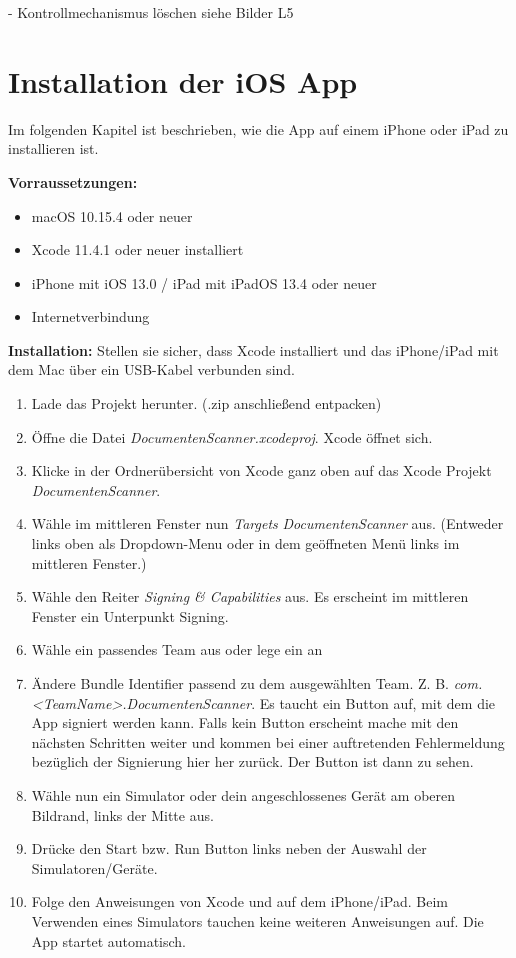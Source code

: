 \documentclass[notables, nomenclature, oneside, 150]{HSMW-Thesis}
\begin{document}
	- Kontrollmechanismus löschen siehe Bilder L5
	
	
\chapter{Installation der iOS App}\label{ch:installation}
	Im folgenden Kapitel ist beschrieben, wie die App auf einem iPhone oder iPad zu installieren ist.
	
	\textbf{Vorraussetzungen:}
	\begin{itemize}
		\item macOS 10.15.4 oder neuer
		\item Xcode 11.4.1 oder neuer installiert
		\item iPhone mit iOS 13.0 / iPad mit iPadOS 13.4 oder neuer
		\item Internetverbindung
	\end{itemize}
	
	\textbf{Installation:}
	Stellen sie sicher, dass Xcode installiert und das iPhone/iPad mit dem Mac über ein USB-Kabel verbunden sind.
	\begin{enumerate}
		\item Lade das Projekt herunter. (.zip anschließend entpacken)
		\item Öffne die Datei \textit{DocumentenScanner.xcodeproj}. Xcode öffnet sich.
		\item Klicke in der Ordnerübersicht von Xcode ganz oben auf das Xcode Projekt \textit{DocumentenScanner}.
		\item Wähle im mittleren Fenster nun \textit{Targets} \textit{DocumentenScanner} aus. (Entweder links oben als Dropdown-Menu oder in dem geöffneten Menü links im mittleren Fenster.)
		\item Wähle den Reiter \textit{Signing & Capabilities} aus. Es erscheint im mittleren Fenster ein Unterpunkt Signing.
		\item Wähle ein passendes Team aus oder lege ein an
		\item Ändere Bundle Identifier passend zu dem ausgewählten Team. Z. B. \textit{com.<TeamName>.DocumentenScanner}. Es taucht ein Button auf, mit dem die App signiert werden kann. Falls kein Button erscheint mache mit den nächsten Schritten weiter und kommen bei einer auftretenden Fehlermeldung bezüglich der Signierung hier her zurück. Der Button ist dann zu sehen.
		\item Wähle nun ein Simulator oder dein angeschlossenes Gerät am oberen Bildrand, links der Mitte aus.
		\item Drücke den Start bzw. Run Button links neben der Auswahl der Simulatoren/Geräte.
		\item Folge den Anweisungen von Xcode und auf dem iPhone/iPad. Beim Verwenden eines Simulators tauchen keine weiteren Anweisungen auf. Die App startet automatisch. 
	\end{enumerate}
	
\end{document}
